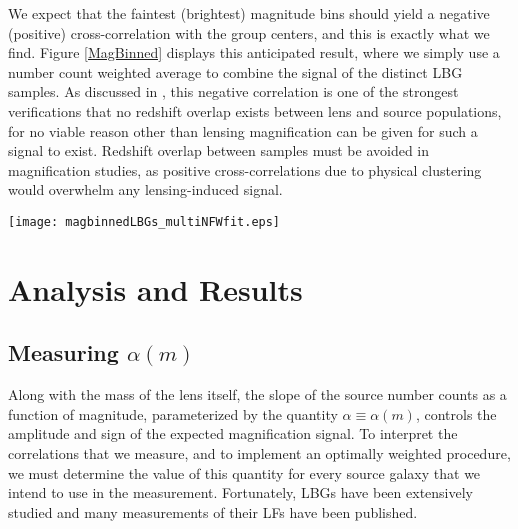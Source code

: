 \documentclass[iop]{emulateapj}
\begin{document}
We expect that the faintest (brightest) magnitude bins should yield a negative (positive) cross-correlation with the group centers, and this is exactly what we find. Figure \ref{MagBinned} displays this anticipated result, where we simply use a number count weighted average to combine the signal of the distinct LBG samples. As discussed in \citet{Hildebrandt09b}, this negative correlation is one of the strongest verifications that no redshift overlap exists between lens and source populations, for no viable reason other than lensing magnification can be given for such a signal to exist. Redshift overlap between samples must be avoided in magnification studies, as positive cross-correlations due to physical clustering would overwhelm any lensing-induced signal.

\begin{figure*}
\begin{center}
\texttt{[image: magbinnedLBGs\_multiNFWfit.eps]}
\caption{Angular cross-correlation of the X-ray groups with Lyman break galaxies, the latter separated into three magnitude-selected samples. The bright sample contains $U$, $G$, $B$, and $R$-dropouts in the magnitude ranges $23<r<25$, $23.5<i<25$,  $23.5<i<25$,  and $24<z<25.5$, respectively. Similarly, the medium ranges are $25<r<25.5$, $25<i<26$,  $25<i<26$,  $25.5<z<26$. The faint ranges are $r>25.5$, $i>26$,  $i>26$,  $z>26$. These magnitude ranges are selected to contain LBGs for which $(\alpha-1)>0$, $\approx 0$, and $<0$. The measured correlations for each LBG sample are simply averaged here (weighting by the number counts) in order to more clearly display this diagnostic check. The dashed curves are calculated from the composite-NFW fit, using weighting by the appropriate $\langle \alpha -1 \rangle$ factor, which is given in each panel. The negative correlation observed for the faintest sample is a good indication that no redshift overlap exists between foreground lenses and background sources.}
\label{MagBinned}
\end{center}
\end{figure*}

\section{Analysis and Results}
\label{results}
\subsection{Measuring $\alpha(m)$}
Along with the mass of the lens itself, the slope of the source number counts as a function of magnitude, parameterized by the quantity $\alpha \equiv \alpha(m)$, controls the amplitude and sign of the expected magnification signal. To interpret the correlations that we measure, and to implement an optimally weighted procedure, we must determine the value of this quantity for every source galaxy that we intend to use in the measurement. Fortunately, LBGs have been extensively studied and many measurements of their LFs have been published.  
\end{document}
